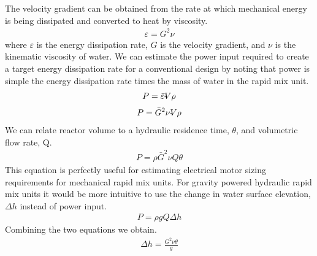 \documentclass[letterpaper,10pt,english]{sphinxmanual}
\begin{document}
The velocity gradient can be obtained from the rate at which mechanical energy is being dissipated and converted to heat by viscosity.
\begin{equation}\label{equation:Rapid_Mix/RM_Theory_and_Future_Work:Rapid_Mix/RM_Theory_and_Future_Work:40}
\begin{split}\varepsilon = G^2 \nu\end{split}
\end{equation}
where \(\varepsilon\) is the energy dissipation rate, \(G\) is the velocity gradient, and \(\nu\) is the kinematic viscosity of water. We can estimate the power input required to create a target energy dissipation rate for a conventional design by noting that power is simple the energy dissipation rate times the mass of water in the rapid mix unit.
\begin{equation}\label{equation:Rapid_Mix/RM_Theory_and_Future_Work:Rapid_Mix/RM_Theory_and_Future_Work:41}
\begin{split}P = \bar\varepsilon \rlap{-}V \rho\end{split}
\end{equation}\begin{equation}\label{equation:Rapid_Mix/RM_Theory_and_Future_Work:Rapid_Mix/RM_Theory_and_Future_Work:42}
\begin{split}P = \bar G^2 \nu \rlap{-}V \rho\end{split}
\end{equation}
We can relate reactor volume to a hydraulic residence time, \(\theta\), and volumetric flow rate, Q.
\begin{equation}\label{equation:Rapid_Mix/RM_Theory_and_Future_Work:Rapid_Mix/RM_Theory_and_Future_Work:43}
\begin{split}P = \rho \bar G^2 \nu Q \theta\end{split}
\end{equation}
This equation is perfectly useful for estimating electrical motor sizing requirements for mechanical rapid mix units. For gravity powered hydraulic rapid mix units it would be more intuitive to use the change in water surface elevation, \(\Delta h\) instead of power input.
\begin{equation}\label{equation:Rapid_Mix/RM_Theory_and_Future_Work:Rapid_Mix/RM_Theory_and_Future_Work:44}
\begin{split}P = \rho g Q \Delta h\end{split}
\end{equation}
Combining the two equations we obtain.
\begin{equation}\label{equation:Rapid_Mix/RM_Theory_and_Future_Work:Rapid_Mix/RM_Theory_and_Future_Work:45}
\begin{split}\Delta h =   \frac{G^2 \nu \theta}{g}\end{split}
\end{equation}
\end{document}
